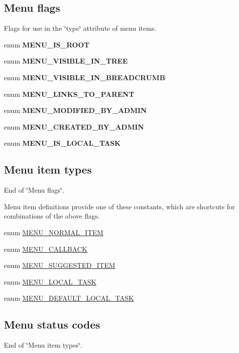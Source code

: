 \subsection*{Menu flags}
Flags for use in the \char`\"{}type\char`\"{} attribute of menu items. \begin{CompactItemize}
\item 
enum \textbf{MENU\_\-IS\_\-ROOT} 
\item 
enum \textbf{MENU\_\-VISIBLE\_\-IN\_\-TREE} 
\item 
enum \textbf{MENU\_\-VISIBLE\_\-IN\_\-BREADCRUMB} 
\item 
enum \textbf{MENU\_\-LINKS\_\-TO\_\-PARENT} 
\item 
enum \textbf{MENU\_\-MODIFIED\_\-BY\_\-ADMIN} 
\item 
enum \textbf{MENU\_\-CREATED\_\-BY\_\-ADMIN} 
\item 
enum \textbf{MENU\_\-IS\_\-LOCAL\_\-TASK} 
\end{CompactItemize}
\subsection*{Menu item types}
End of \char`\"{}Menu flags\char`\"{}.

Menu item definitions provide one of these constants, which are shortcuts for combinations of the above flags. \begin{CompactItemize}
\item 
enum \hyperlink{group__menu_gc42144282c42a943b05511b38c451e4c}{MENU\_\-NORMAL\_\-ITEM} 
\item 
enum \hyperlink{group__menu_g92850b428279a637ce9bac5c1757700f}{MENU\_\-CALLBACK} 
\item 
enum \hyperlink{group__menu_g0860a2534ce61dc1334dc7ede68e20b3}{MENU\_\-SUGGESTED\_\-ITEM} 
\item 
enum \hyperlink{group__menu_g4dc67226400f237bd3c0a5ef7126008b}{MENU\_\-LOCAL\_\-TASK} 
\item 
enum \hyperlink{group__menu_g251e324e062f2e4c703f51231c0d7dc5}{MENU\_\-DEFAULT\_\-LOCAL\_\-TASK} 
\end{CompactItemize}
\subsection*{Menu status codes}
End of \char`\"{}Menu item types\char`\"{}.

